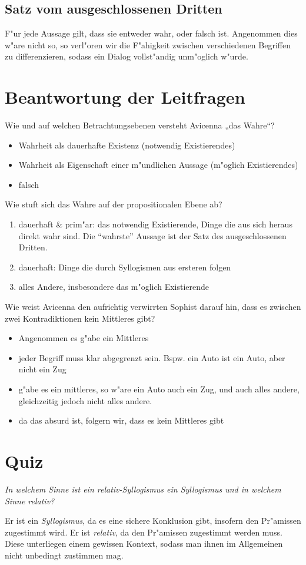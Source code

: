 \documentclass[a4paper,12pt]{article}
\begin{document}
	\subsection{Satz vom ausgeschlossenen Dritten}\label{a3}
		F"ur jede Aussage gilt, dass sie entweder wahr, oder falsch ist. Angenommen dies w"are nicht so, so verl"oren wir die F"ahigkeit zwischen verschiedenen Begriffen zu differenzieren, sodass ein Dialog vollst"andig unm"oglich w"urde.
	
\section{Beantwortung der Leitfragen}
Wie und auf welchen Betrachtungsebenen versteht Avicenna „das Wahre“?
\begin{itemize}
	\item Wahrheit als dauerhafte Existenz (notwendig Existierendes)
	\item Wahrheit als Eigenschaft einer m"undlichen Aussage (m"oglich Existierendes)
	\item falsch
\end{itemize}
Wie stuft sich das Wahre auf der propositionalen Ebene ab?
\begin{enumerate}
	\item dauerhaft \& prim"ar: das notwendig Existierende, Dinge die aus sich heraus direkt wahr sind. Die "`wahrste"' Aussage ist der Satz des ausgeschlossenen Dritten.
	\item dauerhaft: Dinge die durch Syllogismen aus ersteren folgen
	\item alles Andere, insbesondere das m"oglich Existierende
\end{enumerate}
Wie weist Avicenna den aufrichtig verwirrten Sophist darauf hin, dass es zwischen zwei Kontradiktionen kein Mittleres gibt?
\begin{itemize}
	\item Angenommen es g"abe ein Mittleres
	\item jeder Begriff muss klar abgegrenzt sein. Bspw. ein Auto ist ein Auto, aber nicht ein Zug
	\item g"abe es ein mittleres, so w"are ein Auto auch ein Zug, und auch alles andere, gleichzeitig jedoch nicht alles andere.
	\item da das absurd ist, folgern wir, dass es kein Mittleres gibt
\end{itemize}

\section{Quiz}
\emph{In welchem Sinne ist ein relativ-Syllogismus ein Syllogismus und in welchem Sinne relativ?}

Er ist ein \emph{Syllogismus}, da es eine sichere Konklusion gibt, insofern den Pr"amissen zugestimmt wird. Er ist \emph{relativ}, da den Pr"amissen zugestimmt werden muss. Diese unterliegen einem gewissen Kontext, sodass man ihnen im Allgemeinen nicht unbedingt zustimmen mag.
\end{document}
